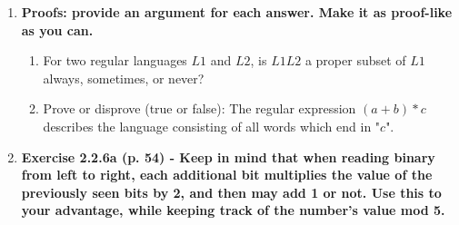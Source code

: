 \begin{enumerate}
\newpage
\item \textbf{Proofs: provide an argument for each answer. Make it as
  proof-like as you can.}
\begin{enumerate}
  \item For two regular languages $L1$ and $L2$, is $L1L2$ a proper subset of
    $L1$ always, sometimes, or never?
  \item Prove or disprove (true or false): The regular expression $(a+b)*c$
    describes the language consisting of all words which end in "$c$".
\end{enumerate}

\newpage
\item \textbf{Exercise 2.2.6a (p. 54) - Keep in mind that when reading binary
  from left to right, each additional bit multiplies the value of the
  previously seen bits by 2, and then may add 1 or not. Use this to your
  advantage, while keeping track of the number's value mod 5.}
\\\\


\end{enumerate}


